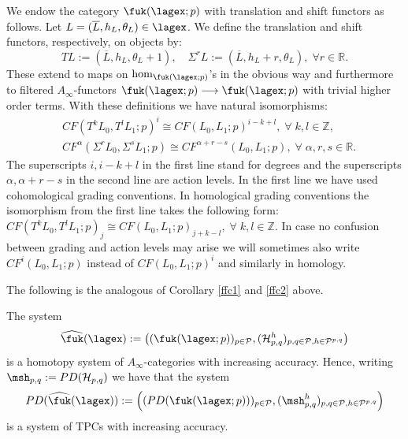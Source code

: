 We endow the
category $\fuk(\lagex;p)$ with translation and shift functors as
follows. Let $L = (\overline{L}, h_L, \theta_L) \in \lagex$. We define
the translation and shift functors, respectively, on objects by:
\begin{equation} \label{eq:T-Sigma-ex-1} TL := (\overline{L}, h_L,
  \theta_L+1), \quad \Sigma^r L := (\overline{L}, h_L+r, \theta_L), \;
  \forall r \in \mathbb{R}.
\end{equation}
These extend to maps on $\hom_{\fuk(\lagex;p)}$'s in the obvious way
and furthermore to filtered $A_{\infty}$-functors
$\fuk(\lagex;p) \longrightarrow \fuk(\lagex;p)$ with trivial higher
order terms.  With these definitions we have natural isomorphisms:
\begin{equation} \label{eq:T-Sigma-ex-2}
  \begin{aligned}
    & CF(T^kL_0, T^lL_1; p)^i \cong
    CF(L_0, L_1; p)^{i-k+l}, \; \forall \; k,l \in \mathbb{Z}, \\
    & CF^{\alpha}(\Sigma^rL_0, \Sigma^sL_1;p) \cong
    CF^{\alpha+r-s}(L_0, L_1; p), \; \forall \; \alpha, r, s \in
    \mathbb{R}.
  \end{aligned}
\end{equation}
The superscripts $i, i-k+l$ in the first line stand for degrees and
the superscripts $\alpha, \alpha+r-s$ in the second line are action
levels.  In the first line we have used cohomological grading
conventions. In homological grading conventions the isomorphism from
the first line takes the following form:
$CF(T^kL_0, T^lL_1; p)_j \cong CF(L_0, L_1; p)_{j+k-l}, \; \forall \;
k,l \in \mathbb{Z}$. In case no confusion between grading and  action levels may arise
we will sometimes also write $CF^i(L_0, L_1;p)$ instead of
$CF(L_0, L_1; p)^i$ and similarly in homology.

The following is the analogous of Corollary \ref{ffc1} and \ref{ffc2} above.
\begin{cor}
  The system $$\widehat{\fuk}(\lagex):= \left((\fuk(\lagex;p))_{p\in \mathcal{P}}, (\mathcal{H}^h_{p,q})_{p,q\in \mathcal{P}, h\in \mathcal{P}^{p,q}}\right)$$ is a homotopy system of $A_\infty$-categories with increasing accuracy. Hence, writing $\msh_{p,q}:= PD(\mathcal{H}_{p,q})$ we have that the system $$PD(\widehat{\fuk}(\lagex)):=\left((PD(\fuk(\lagex;p)))_{p\in \mathcal{P}}, (\msh^h_{p,q})_{p,q\in \mathcal{P}, h\in \mathcal{P}^{p,q}}\right)$$ is a system of TPCs with increasing accuracy.
\end{cor}

